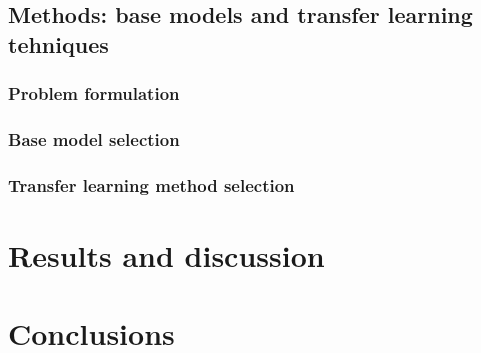 \documentclass{article}
\begin{document}
\subsection{Methods: base models and transfer learning tehniques}

\subsubsection{Problem formulation}

\subsubsection{Base model selection}

\subsubsection{Transfer learning method selection}

\section{Results and discussion}

\section{Conclusions}

\printbibliography
\end{document}
